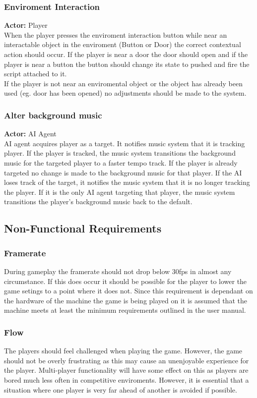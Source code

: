 \documentclass[11pt,a4paper]{article}
\begin{document}
\subsubsection{Enviroment Interaction}
\textbf{Actor:} Player \smallskip \\
When the player presses the enviroment interaction button while near an interactable object in the enviroment (Button or Door) the correct contextual action should occur. If the player is near a door the door should open and if the player is near a button the button should change its state to pushed and fire the script attached to it.\smallskip\\
If the player is not near an enviromental object or the object has already been used (eg. door has been opened) no adjustments should be made to the system.

\subsubsection{Alter background music}
\textbf{Actor:} AI Agent\smallskip\\
AI agent acquires player as a target. It notifies music system that it is tracking player. If the player is tracked, the music system transitions the background music for the targeted player to a faster tempo track. If the player is already targeted no change is made to the background music for that player. If the AI loses track of the target, it notifies the music system that it is no longer tracking the player. If it is the only AI agent targeting that player, the music system transitions the player's background music back to the default.
\subsection{Non-Functional Requirements}
\subsubsection{Framerate}
During gameplay the framerate should not drop below 30fps in almost any circumstance. If this does occur it should be possible for the player to lower the game setings to a point where it does not. Since this requirement is dependant on the hardware of the machine the game is being played on it is assumed that the machine meets at least the minimum requirements outlined in the user manual.
\subsubsection{Flow}
The players should feel challenged when playing the game. However, the game should not be overly frustrating as this may cause an unenjoyable experience for the player. Multi-player functionality will have some effect on this as players are bored much less often in competitive enviroments. However, it is essential that a situation where one player is very far ahead of another is avoided if possible.
\end{document}
